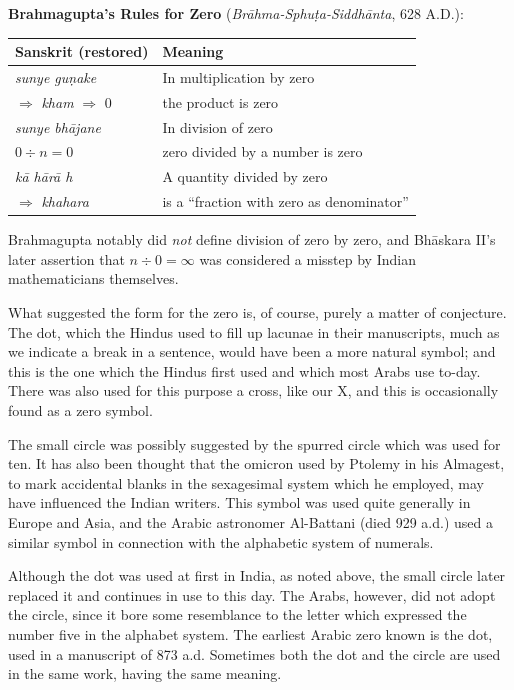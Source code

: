 \documentclass[11pt,a4paper]{article}
\newenvironment{enhancednote}{%
  \begin{tcolorbox}[colback=enhancedbg,colframe=notecolor,boxrule=1pt,
    left=10pt,right=10pt,top=8pt,bottom=8pt,
    title={\textbf{Enhanced Edition Note}},fonttitle=\bfseries\color{notecolor}]
}{\end{tcolorbox}}
\begin{document}
\begin{enhancednote}
\textbf{Brahmagupta's Rules for Zero} (\textit{Br\=ahma-Sphu\d{t}a-Siddh\=anta}, 628 A.D.):

\begin{center}
\begin{tabular}{|l|l|}
\hline
\textbf{Sanskrit (restored)} & \textbf{Meaning} \\
\hline
\textit{sunye gu\d{n}ake} & In multiplication by zero \\
$\Rightarrow$ \textit{kham} $\Rightarrow$ 0 & the product is zero \\
\textit{sunye bh\=ajane} & In division of zero \\
$0 \div n = 0$ & zero divided by a number is zero \\
\textit{k\=a h\=ar\=a h} & A quantity divided by zero \\
$\Rightarrow$ \textit{khahara} & is a ``fraction with zero as denominator'' \\
\hline
\end{tabular}
\end{center}

Brahmagupta notably did \textit{not} define division of zero by zero, and Bh\=askara II's later assertion that $n \div 0 = \infty$ was considered a misstep by Indian mathematicians themselves.
\end{enhancednote}

What suggested the form for the zero is, of course, purely a matter of conjecture. The dot, which the Hindus used to fill up lacunae in their manuscripts, much as we indicate a break in a sentence, would have been a more natural symbol; and this is the one which the Hindus first used and which most Arabs use to-day. There was also used for this purpose a cross, like our X, and this is occasionally found as a zero symbol.

The small circle was possibly suggested by the spurred circle which was used for ten. It has also been thought that the omicron used by Ptolemy in his Almagest, to mark accidental blanks in the sexagesimal system which he employed, may have influenced the Indian writers. This symbol was used quite generally in Europe and Asia, and the Arabic astronomer Al-Battani (died 929 a.d.) used a similar symbol in connection with the alphabetic system of numerals.

Although the dot was used at first in India, as noted above, the small circle later replaced it and continues in use to this day. The Arabs, however, did not adopt the circle, since it bore some resemblance to the letter which expressed the number five in the alphabet system. The earliest Arabic zero known is the dot, used in a manuscript of 873 a.d. Sometimes both the dot and the circle are used in the same work, having the same meaning.
\end{document}
